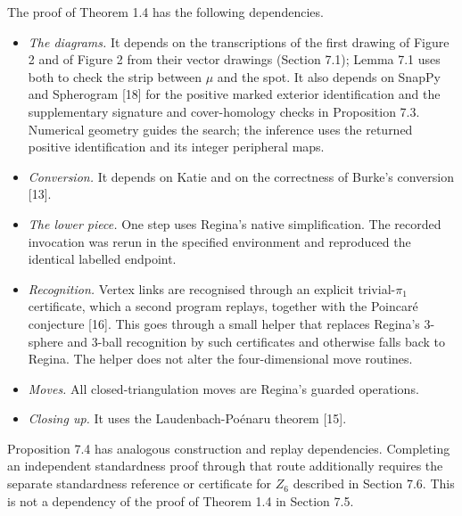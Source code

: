 \documentclass[11pt,letterpaper]{article}
\begin{document}
The proof of Theorem 1.4 has the following dependencies.
\begin{itemize}
\item \emph{The diagrams.} It depends on the transcriptions of the first drawing of Figure 2 and of Figure 2 from their vector drawings (Section 7.1); Lemma 7.1 uses both to check the strip between $\mu$ and the spot. It also depends on SnapPy and Spherogram [18] for the positive marked exterior identification and the supplementary signature and cover-homology checks in Proposition 7.3. Numerical geometry guides the search; the inference uses the returned positive identification and its integer peripheral maps.
\item \emph{Conversion.} It depends on Katie and on the correctness of Burke's conversion [13].
\item \emph{The lower piece.} One step uses Regina's native simplification. The recorded invocation was rerun in the specified environment and reproduced the identical labelled endpoint.
\item \emph{Recognition.} Vertex links are recognised through an explicit trivial-$\pi_1$ certificate, which a second program replays, together with the Poincaré conjecture [16]. This goes through a small helper that replaces Regina's 3-sphere and 3-ball recognition by such certificates and otherwise falls back to Regina. The helper does not alter the four-dimensional move routines.
\item \emph{Moves.} All closed-triangulation moves are Regina's guarded operations.
\item \emph{Closing up.} It uses the Laudenbach-Poénaru theorem [15].
\end{itemize}
Proposition 7.4 has analogous construction and replay dependencies. Completing an independent standardness proof through that route additionally requires the separate standardness reference or certificate for $Z_6$ described in Section 7.6. This is not a dependency of the proof of Theorem 1.4 in Section 7.5.
\end{document}
